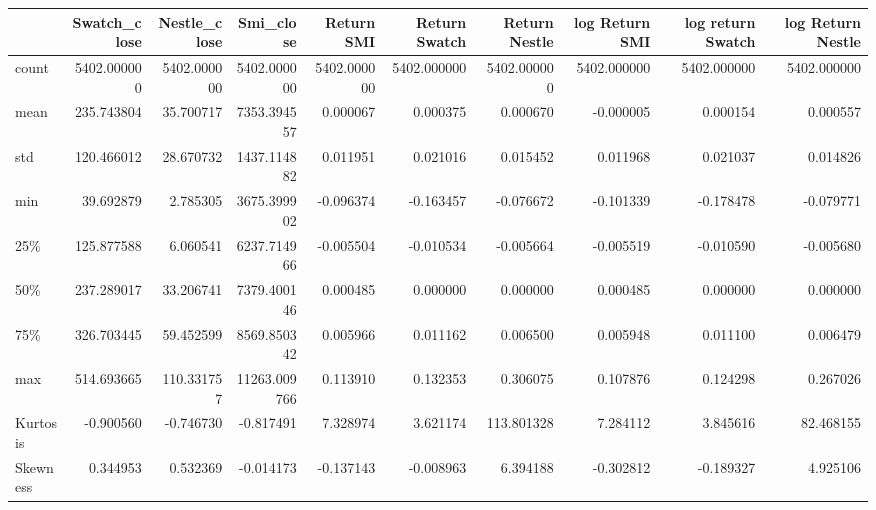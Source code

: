 \begin{tabular}{lrrrrrrrrr}
\toprule
{} &  Swatch\_close &  Nestle\_close &     Smi\_close &   Return SMI &  Return Swatch &  Return Nestle &  log Return SMI &  log return Swatch &  log Return Nestle \\
\midrule
count    &   5402.000000 &   5402.000000 &   5402.000000 &  5402.000000 &    5402.000000 &    5402.000000 &     5402.000000 &        5402.000000 &        5402.000000 \\
mean     &    235.743804 &     35.700717 &   7353.394557 &     0.000067 &       0.000375 &       0.000670 &       -0.000005 &           0.000154 &           0.000557 \\
std      &    120.466012 &     28.670732 &   1437.114882 &     0.011951 &       0.021016 &       0.015452 &        0.011968 &           0.021037 &           0.014826 \\
min      &     39.692879 &      2.785305 &   3675.399902 &    -0.096374 &      -0.163457 &      -0.076672 &       -0.101339 &          -0.178478 &          -0.079771 \\
25\%      &    125.877588 &      6.060541 &   6237.714966 &    -0.005504 &      -0.010534 &      -0.005664 &       -0.005519 &          -0.010590 &          -0.005680 \\
50\%      &    237.289017 &     33.206741 &   7379.400146 &     0.000485 &       0.000000 &       0.000000 &        0.000485 &           0.000000 &           0.000000 \\
75\%      &    326.703445 &     59.452599 &   8569.850342 &     0.005966 &       0.011162 &       0.006500 &        0.005948 &           0.011100 &           0.006479 \\
max      &    514.693665 &    110.331757 &  11263.009766 &     0.113910 &       0.132353 &       0.306075 &        0.107876 &           0.124298 &           0.267026 \\
Kurtosis &     -0.900560 &     -0.746730 &     -0.817491 &     7.328974 &       3.621174 &     113.801328 &        7.284112 &           3.845616 &          82.468155 \\
Skewness &      0.344953 &      0.532369 &     -0.014173 &    -0.137143 &      -0.008963 &       6.394188 &       -0.302812 &          -0.189327 &           4.925106 \\
\bottomrule
\end{tabular}
